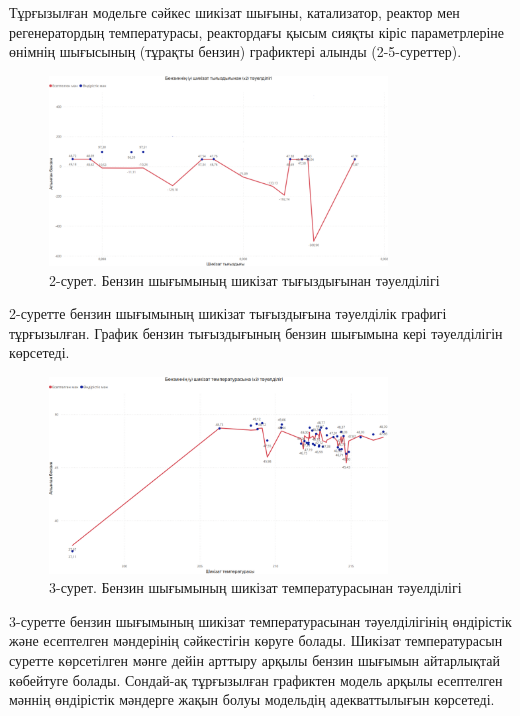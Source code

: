 Тұрғызылған модельге сәйкес шикізат шығыны, катализатор, реактор мен
регенератордың температурасы, реактордағы қысым сияқты кіріс
параметрлеріне өнімнің шығысының (тұрақты бензин) графиктері алынды
(2-5-суреттер).

\begin{figure}[H]
	\centering
	\includegraphics[width=0.8\textwidth]{media/ict/image95}
	\caption*{2-сурет. Бензин шығымының шикізат тығыздығынан тәуелділігі}
\end{figure}




2-суретте бензин шығымының шикізат тығыздығына тәуелділік графигі
тұрғызылған. График бензин тығыздығының бензин шығымына кері
тәуелділігін көрсетеді.

\begin{figure}[H]
	\centering
	\includegraphics[width=0.8\textwidth]{media/ict/image96}
	\caption*{3-сурет. Бензин шығымының шикізат температурасынан тәуелділігі}
\end{figure}




3-суретте бензин шығымының шикізат температурасынан тәуелділігінің
өндірістік және есептелген мәндерінің сәйкестігін көруге болады. Шикізат
температурасын суретте көрсетілген мәнге дейін арттыру арқылы бензин
шығымын айтарлықтай көбейтуге болады. Сондай-ақ тұрғызылған графиктен
модель арқылы есептелген мәннің өндірістік мәндерге жақын болуы
модельдің адекваттылығын көрсетеді.

